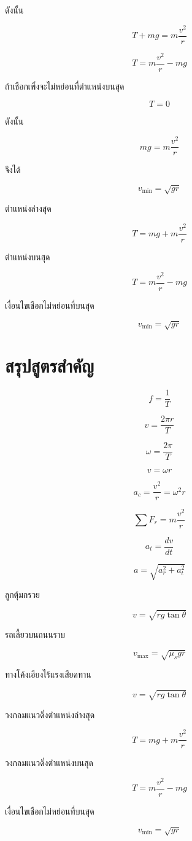 ดังนั้น

\[
T+mg=m\frac{v^2}{r}
\]

\[
T=m\frac{v^2}{r}-mg
\]

ถ้าเชือกเพิ่งจะไม่หย่อนที่ตำแหน่งบนสุด

\[
T=0
\]

ดังนั้น

\[
mg=m\frac{v^2}{r}
\]

จึงได้

\[
v_{\min}=\sqrt{gr}
\]

\begin{tcolorbox}[title=วงกลมแนวดิ่ง]
ตำแหน่งล่างสุด

\[
T=mg+m\frac{v^2}{r}
\]

ตำแหน่งบนสุด

\[
T=m\frac{v^2}{r}-mg
\]

เงื่อนไขเชือกไม่หย่อนที่บนสุด

\[
v_{\min}=\sqrt{gr}
\]
\end{tcolorbox}

\section{สรุปสูตรสำคัญ}

\begin{tcolorbox}[title=สรุปบท: การเคลื่อนที่เป็นวงกลม]
\[
f=\frac{1}{T}
\]

\[
v=\frac{2\pi r}{T}
\]

\[
\omega=\frac{2\pi}{T}
\]

\[
v=\omega r
\]

\[
a_c=\frac{v^2}{r}=\omega^2r
\]

\[
\sum F_r=m\frac{v^2}{r}
\]

\[
a_t=\frac{dv}{dt}
\]

\[
a=\sqrt{a_r^2+a_t^2}
\]
\end{tcolorbox}

\begin{tcolorbox}[title=สรุปสูตรประยุกต์]
ลูกตุ้มกรวย

\[
v=\sqrt{rg\tan\theta}
\]

รถเลี้ยวบนถนนราบ

\[
v_{\max}=\sqrt{\mu_sgr}
\]

ทางโค้งเอียงไร้แรงเสียดทาน

\[
v=\sqrt{rg\tan\theta}
\]

วงกลมแนวดิ่งตำแหน่งล่างสุด

\[
T=mg+m\frac{v^2}{r}
\]

วงกลมแนวดิ่งตำแหน่งบนสุด

\[
T=m\frac{v^2}{r}-mg
\]

เงื่อนไขเชือกไม่หย่อนที่บนสุด

\[
v_{\min}=\sqrt{gr}
\]
\end{tcolorbox}

